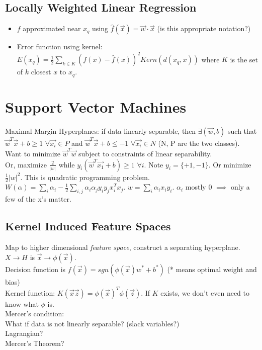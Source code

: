 \documentclass[11pt]{article}
\begin{document}
\subsection{Locally Weighted Linear Regression}
\begin{itemize}
\item $f$ approximated near $x_q$ using $\hat{f}(\vec{x}) = \vec{w} \cdot \vec{x}$ (is this appropriate notation?)
\item Error function using kernel: $E(x_q) = \frac12 \sum_{k\in K}{(f(x) - \hat{f}(x))^2 Kern(d(x_q, x))}$ where $K$ is the set of $k$ closest $x$ to $x_q$.
\end{itemize}

\section{Support Vector Machines}
Maximal Margin Hyperplanes: if data linearly separable, then $\exists (\vec{w}, b)$ such that $\vec{w}^T\vec{x} + b \geq 1$ $\forall \vec{x_i} \in P$ and $\vec{w}^T\vec{x} + b \leq -1$ $\forall \vec{x_i} \in N$ (N, P are the two classes). Want to minimize $\vec{w}^T\vec{w}$ subject to constraints of linear separability.\\ Or, maximize $\frac2{|w|}$ while $y_i(\vec{w}^T\vec{x_1}+b) \geq 1$ $\forall i$. Note $y_i =\{+1, -1\}$. Or minimize $\frac12 |w|^2$. This is quadratic programming problem.\\
$W(\alpha) = \sum_{i} \alpha_i - \frac12 \sum_{i,j} \alpha_i \alpha_j y_i y_j x_i^T x_j$. $w = \sum_i \alpha_i x_i y_i$. $\alpha_i$ mostly 0 $\implies$ only a few of the x's matter.
\subsection{Kernel Induced Feature Spaces}
Map to higher dimensional \textit{feature space}, construct a separating hyperplane. $X \rightarrow H$ is $\vec{x} \rightarrow \phi(\vec{x}).$\\
Decision function is $f(\vec{x}) = sgn (\phi(\vec{x}) w^*+b^*)$ (* means optimal weight and bias)\\
Kernel function: $K(\vec{x} \vec{z}) =\phi(\vec{x})^T\phi(\vec{z})$. If $K$ exists, we don't even need to know what $\phi$ is.\\
Mercer's condition: \\
What if data is not linearly separable? (slack variables?)\\
Lagrangian?\\
Mercer's Theorem? \\
\end{document}
